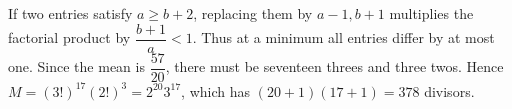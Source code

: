 If two entries satisfy $a\ge b+2$, replacing them by $a-1,b+1$ multiplies the factorial product by $\dfrac{b+1}{a}<1$. Thus at a minimum all entries differ by at most one. Since the mean is $\dfrac{57}{20}$, there must be seventeen threes and three twos. Hence $M=(3!)^{17}(2!)^3=2^{20}3^{17}$, which has $(20+1)(17+1)=\boxed{378}$ divisors.
